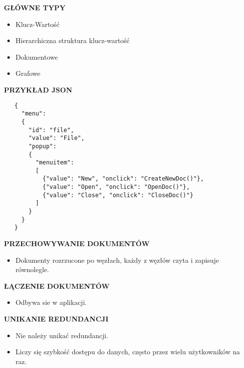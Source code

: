 \documentclass[a5paper,6pt]{article}
\begin{document}
    \vskip 0.5cm

    \textbf{GŁÓWNE TYPY}
    \begin{itemize}
        \item Klucz-Wartość
        \item Hierarchiczna struktura klucz-wartość
        \item Dokumentowe
        \item Grafowe
    \end{itemize}

\pagebreak

    \textbf{PRZYKŁAD JSON}
    \begin{verbatim}
   {
     "menu":
     {
       "id": "file",
       "value": "File",
       "popup":
       {
         "menuitem":
         [
           {"value": "New", "onclick": "CreateNewDoc()"},
           {"value": "Open", "onclick": "OpenDoc()"},
           {"value": "Close", "onclick": "CloseDoc()"}
         ]
       }
     }
   }
    \end{verbatim}

    \textbf{PRZECHOWYWANIE DOKUMENTÓW}
    \begin{itemize}
        \item Dokumenty rozrzucone po węzłach, każdy z węzłów czyta i zapisuje
              równolegle.
    \end{itemize}

    \textbf{ŁĄCZENIE DOKUMENTÓW}
    \begin{itemize}
        \item Odbywa sie w aplikacji.
    \end{itemize}

    \textbf{UNIKANIE REDUNDANCJI}
    \begin{itemize}
        \item Nie należy unikać redundancji.
        \item Liczy się szybkość dostępu do danych, często przez wielu
              użytkowników na raz.
    \end{itemize}


    \newpage
    ~
\end{document}

